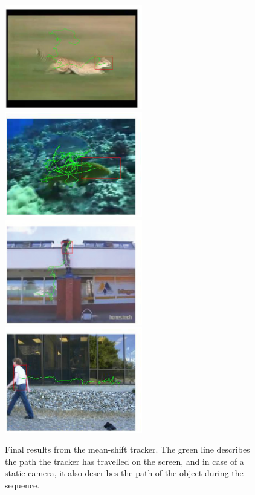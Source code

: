 \documentclass[a4paper,11pt]{article}
\begin{document}
		\begin{figure}[H]
			\begin{center}
				\includegraphics[width=6cm]{img/res_animal2_hsv.eps} 
				\includegraphics[width=6cm]{img/res_fish2_hue.eps}\\
				\includegraphics[width=6cm]{img/res_freerun1_hue.eps}
				\includegraphics[width=6cm]{img/res_walk1_hsv.eps}\\
			\end{center}
			\caption{
				Final results from the mean-shift tracker. The green line describes the path the tracker has travelled on the screen, and in case of a static camera, it also describes the path of the object during the sequence.
			}
			\label{fig:RESULTS}
		\end{figure}
\end{document}
